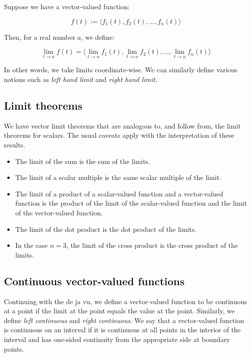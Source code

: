 \documentclass[10pt]{amsart}
\begin{document}
Suppose we have a vector-valued function:

$$f(t) := \langle f_1(t), f_2(t), \dots, f_n(t) \rangle$$

Then, for a real number $a$, we define:

$$\lim_{t \to a} f(t) = \langle \lim_{t \to a} f_1(t), \lim_{t \to a} f_2(t), \dots, \lim_{t \to a} f_n(t) \rangle$$

In other words, we take limits coordinate-wise. We can similarly
define various notions such as {\em left hand limit} and {\em right
hand limit}. 

\subsection{Limit theorems}

We have vector limit theorems that are analogous to, and follow from,
the limit theorems for scalars. The usual caveats apply with the
interpretation of these results. 

\begin{itemize}
\item The limit of the sum is the sum of the limits.
\item The limit of a scalar multiple is the same scalar multiple of the limit.
\item The limit of a product of a scalar-valued function and a
  vector-valued function is the product of the limit of the
  scalar-valued function and the limit of the vector-valued function.
\item The limit of the dot product is the dot product of the limits.
\item In the case $n = 3$, the limit of the cross product is the cross
  product of the limits.
\end{itemize}

\subsection{Continuous vector-valued functions}

Continuing with the de ja vu, we define a vector-valued function to be
continuous at a point if the limit at the point equals the value at
the point. Similarly, we define {\em left continuous} and {\em right
continuous}. We say that a vector-valued function is continuous on an
interval if it is continuous at all points in the interior of the
interval and has one-sided continuity from the appropriate side at
boundary points.
\end{document}
